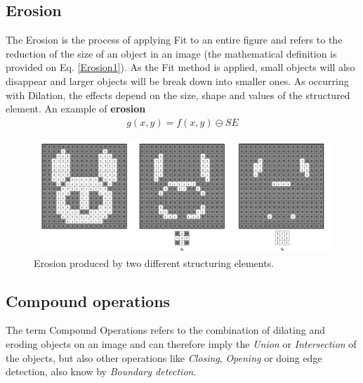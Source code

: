 \subsection{Erosion}
The Erosion is the process of applying Fit to an entire figure and refers to the reduction of the size of an object in an image (the mathematical definition is provided on Eq. \ref{Erosion1}). As the Fit method is applied, small objects will also disappear and larger objects will be break down into smaller ones. As occurring with Dilation, the effects depend on the size, shape and values of the structured element. An example of \textbf{erosion}
\begin{equation}
\begin{aligned}
{g(x, y)}={f(x,y)}\ominus{SE}
\label{Erosion1}
	\end{aligned}
\end{equation}

\begin{figure}[htbp]
\centering
\includegraphics[width=1\textwidth]{Pictures/Theory/Erosion.png}
\caption{Erosion produced by two different structuring elements.}
\label{fig:Erosion}
\end{figure}

\subsection{Compound operations}
The term Compound Operations refers to the combination of dilating and eroding objects on an image and can therefore imply the \textit{Union} or \textit{Intersection} of the objects, but also other operations like \textit{Closing}, \textit{Opening} or doing edge detection, also know by \textit{Boundary detection}.
